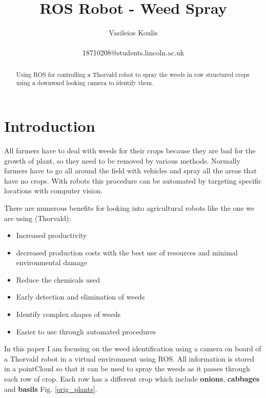 \documentclass[journal]{IEEEtran}
\begin{document}
\title{ROS Robot - Weed Spray}
\author{Vasileios Koulis\\~\\18710208@students.lincoln.ac.uk}


\maketitle


\begin{abstract}
Using ROS for controlling a Thorvald robot to spray the weeds in row structured crops using a downward looking camera to identify them.
\end{abstract}


\section{Introduction}
All farmers have to deal with weeds for their crops because they are bad for the growth of plant, so they need to be removed by various methods. Normally farmers have to go all around the field with vehicles and spray all the areas that have no crops. With robots this procedure can be automated by targeting specific locations with computer vision. 

There are numerous benefits for looking into agricultural robots like the one we are using (Thorvald):

\begin{itemize}
  \item Increased productivity
  \item decreased production costs with the best use of resources and minimal environmental damage
  \item Reduce the chemicals used
  \item Early detection and elimination of weeds 
  \item Identify complex shapes of weeds
  \item Easier to use through automated procedures
\end{itemize}

In this paper I am focusing on the weed identification using a camera on board of a Thorvald robot in a virtual environment using ROS. All information is stored in a pointCloud so that it can be used to spray the weeds as it passes through each row of crop. Each row has a different crop which include \textbf{onions}, \textbf{cabbages} and \textbf{basils} Fig. \ref{orig_plants}.
\end{document}

